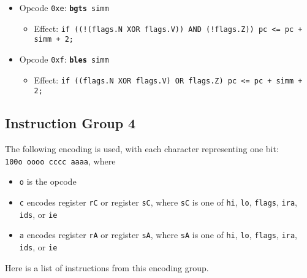 \documentclass{article}
\begin{document}
\begin{itemize}
		\item Opcode \texttt{0xe}:
			\texttt{\textbf{bgts} simm}
		\begin{itemize}
			\item Effect:
				\texttt{if ((!(flags.N XOR flags.V)) AND (!flags.Z))
					pc <= pc + simm + 2;}
		\end{itemize}

		\item Opcode \texttt{0xf}:
			\texttt{\textbf{bles} simm}
		\begin{itemize}
			\item Effect:
				\texttt{if ((flags.N XOR flags.V) OR flags.Z)
					pc <= pc + simm + 2;}
		\end{itemize}
	\end{itemize}

	\doublespacing
	\subsection{Instruction Group 4}
	The following encoding is used, with each character representing one
	bit:  \\
	\texttt{100o oooo cccc aaaa}, where

	\singlespacing
	\begin{itemize}
		\item \texttt{o} is the opcode
		\item \texttt{c} encodes register \texttt{rC} or register
		\texttt{sC}, where \texttt{sC} is one of \texttt{hi}, \texttt{lo},
		\texttt{flags}, \texttt{ira}, \texttt{ids}, or \texttt{ie}
		\item \texttt{a} encodes register \texttt{rA} or register
		\texttt{sA}, where \texttt{sA} is one of \texttt{hi}, \texttt{lo},
		\texttt{flags}, \texttt{ira}, \texttt{ids}, or \texttt{ie}
	\end{itemize}
	\doublespacing

	Here is a list of instructions from this encoding group.
\end{document}
